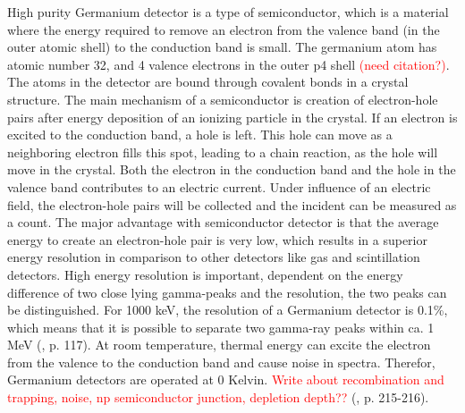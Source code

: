 High purity Germanium detector is a type of semiconductor, which is a material where the energy required to remove an electron from the valence band (in the outer atomic shell) to the conduction band is small. The germanium atom has atomic number 32, and 4 valence electrons in the outer p4 shell \textcolor{red}{(need citation?)}. The atoms in the detector are bound through covalent bonds in a crystal structure. The main mechanism of a semiconductor is creation of electron-hole pairs after energy deposition of an ionizing particle in the crystal. If an electron is excited to the conduction band, a hole is left. This hole can move as a neighboring electron fills this spot, leading to a chain reaction, as the hole will move in the crystal. Both the electron in the conduction band and the hole in the valence band contributes to an electric current. Under influence of an electric field, the electron-hole pairs will be collected and the incident can be measured as a count. The major
advantage with semiconductor detector is that the average energy to create an electron-hole pair is
very low, which results in a superior energy resolution in comparison to other detectors like gas and
scintillation detectors. High energy resolution is important, dependent on the energy difference of two close lying gamma-peaks and the resolution, the two peaks can be distinguished. For 1000 keV, the resolution of a Germanium detector is 0.1\%, which means that it is possible to separate two gamma-ray peaks within ca. 1 MeV (\cite{Leo1994}, p. 117). At room temperature, thermal
energy can excite the electron from the valence to the conduction band and cause noise in spectra.
Therefor, Germanium detectors are operated at 0 Kelvin. \textcolor{red}{Write about recombination and trapping,
noise, np semiconductor junction, depletion depth??} (\cite{Leo1994}, p. 215-216). \\

